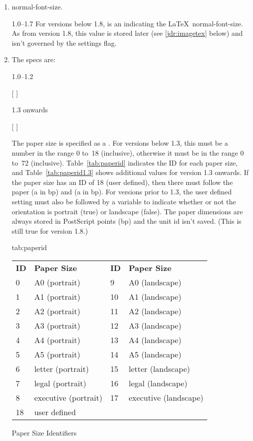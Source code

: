 \begin{numbered}
\begin{enumerate}
\item \Gls{normal-font-size}.
  \begin{jdrversion}{1.0--1.7}
  For versions below 1.8,  is an  indicating the
  \LaTeX\ \gls{normal-font-size}. As from version 1.8, this value
  is stored later (see \ref{jdr:imagetex} below) and isn't governed by
  the settings flag.
  \end{jdrversion}

  \item\label{jdr:paper}The  specs are:
  \begin{jdrversion}{1.0--1.2}
  \begin{syntaxline}
   [  ]
  \end{syntaxline}
  \end{jdrversion}
  \begin{jdrversion}{1.3 onwards}
  \begin{syntaxline}
   [ ]
  \end{syntaxline}
  \end{jdrversion}
  The paper size  is specified as a .
  For versions below 1.3, this must be a number in the range 0 to~18
  (inclusive), otherwise it must be in the range 0 to~72 (inclusive).
  Table~\ref{tab:paperid} indicates the ID for each paper size,
  and Table~\ref{tab:paperid1.3} shows additional values for version
  1.3 onwards.  If the paper size has an ID of 18 (user defined), then there
  must follow the paper  (a  in \gls{bp})
  and  (a  in \gls{bp}). For versions prior to 1.3,
  the user defined setting must also be followed by
   a  variable to indicate
  whether or not the orientation is portrait (true) or
  landscape (false). The paper dimensions are always stored
  in PostScript points (\gls{bp}) and the unit id isn't saved.
  (This is still true for version 1.8.)

\FloatTable
{tab:paperid}
{%
  \begin{tabular}{llll}
  \bfseries ID & \bfseries Paper Size &
  \bfseries ID & \bfseries Paper Size\\
  0 & A0 (portrait) & 9 & A0 (landscape)\\
  1 & A1 (portrait) & 10 & A1 (landscape)\\
  2 & A2 (portrait) & 11 & A2 (landscape)\\
  3 & A3 (portrait) & 12 & A3 (landscape)\\
  4 & A4 (portrait) & 13 & A4 (landscape)\\
  5 & A5 (portrait) & 14 & A5 (landscape)\\
  6 & letter (portrait) & 15 & letter (landscape)\\
  7 & legal (portrait) & 16 & legal (landscape)\\
  8 & executive (portrait) & 17 & executive (landscape)\\
  18 & user defined
  \end{tabular}
}
{Paper Size Identifiers}


\end{enumerate}
\end{numbered}
